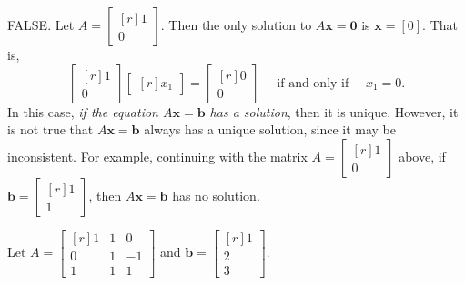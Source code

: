\documentclass[addpoints,12pt]{exam}
\theoremstyle{remark}
\renewcommand{\vec}[1]{\mathbf{#1}}
\newcommand{\<}{\ensuremath{\langle}}
\renewcommand{\>}{\ensuremath{\rangle}}
\newcommand\vb{\vec{b}}
\newcommand\vx{\vec{x}}
\newcommand\vzero{\vec{0}}
\begin{document}
\begin{questions}
\begin{parts}
      \begin{solution}
        FALSE. 
        Let $A = \begin{bmatrix*}[r] 1\\0 \end{bmatrix*}$.
        Then the only solution to $A\vx =\vzero$ is $\vx =[0]$. That is,
        \[\begin{bmatrix*}[r] 1\\0 \end{bmatrix*} 
        \begin{bmatrix*}[r] x_1 \end{bmatrix*} 
        =\begin{bmatrix*}[r] 0\\0 \end{bmatrix*}
        \quad \text{ if and only if } \quad x_1 = 0.\]
        In this case, \emph{if the equation $A\vx = \vb$ has a solution}, then it is unique.
        However, it is not true that $A\vx = \vb$ always has a unique solution,
        since it may be inconsistent.
        For example, continuing with the matrix $A = \begin{bmatrix*}[r] 1\\0 \end{bmatrix*}$ above, 
        if $\vb = \begin{bmatrix*}[r] 1\\1\end{bmatrix*}$, then $A\vx = \vb$ has no solution.
      \end{solution}

 
     \end{parts}

  \newpage

  \question  Let 
  $A = \begin{bmatrix*}[r] 1 & 1 & 0\\ 0 & 1& -1\\ 1 & 1 & 1\end{bmatrix*}$
    and $\vb = \begin{bmatrix*}[r] 1\\2\\3\end{bmatrix*}$.
\end{questions}
\end{document}
